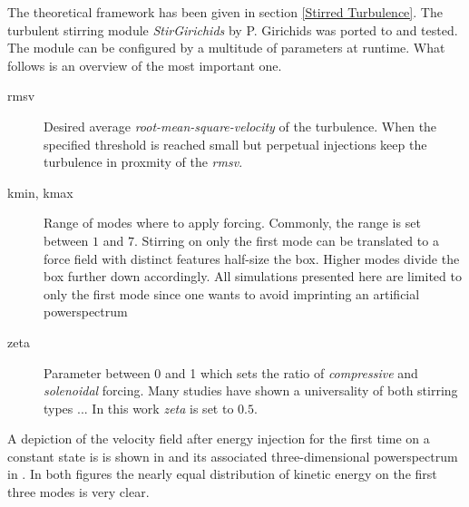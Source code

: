 The theoretical framework has been given in section \ref{Stirred Turbulence}. The turbulent
stirring module \emph{StirGirichids} by P. Girichids was ported to \FLEXI and tested. The
module can be configured by a multitude of parameters at runtime. What follows is an overview
of the most important one.
\begin{description}
    \item [rmsv] Desired average \emph{root-mean-square-velocity} of the turbulence. When the
            specified threshold is reached small but perpetual injections keep the turbulence
            in proxmity of the \emph{rmsv}.
    \item [kmin, kmax] Range of modes where to apply forcing. Commonly, the range
            is set between $1$ and $7$. Stirring on only the first mode can be translated to a
            force field with distinct features half-size the box. Higher modes divide the box further
            down accordingly. All simulations presented here are limited to only the
            first mode since one wants to avoid imprinting an artificial powerspectrum
    \item [zeta] Parameter between 0 and 1 which sets the ratio of \emph{compressive} and \emph{solenoidal}
            forcing. Many studies have shown a universality of both stirring types ...
            In this work \emph{zeta} is set to $0.5$.
\end{description}
A depiction of the velocity field after energy injection for the first time on
a constant state is is shown in  and its associated
three-dimensional powerspectrum in . In
both figures the nearly equal distribution of kinetic energy on the first three modes
is very clear.
